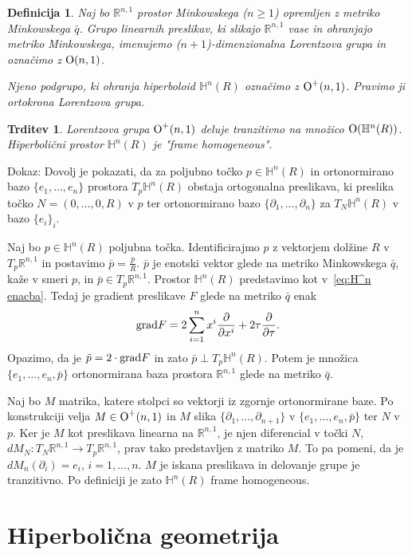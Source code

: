 \documentclass[a4paper]{article}
\newtheorem{definicija}{Definicija}
\newtheorem{trditev}{Trditev}
\begin{document}
\begin{definicija}
Naj bo $\mathbb{R}^{n,1}$ prostor Minkowskega ($n \geq 1$) opremljen z metriko Minkowskega $\bar{q}$. Grupo linearnih preslikav, ki slikajo $\mathbb{R}^{n,1}$ vase in ohranjajo metriko Minkowskega, imenujemo \emph{($n+1$)-dimenzionalna Lorentzova grupa} in označimo z $\textup{O}(n,1)$.

Njeno podgrupo, ki ohranja hiperboloid $\mathbb{H}^{n}(R)$ označimo z $\textup{O}^{+}(n,1)$. Pravimo ji \emph{ortokrona Lorentzova grupa}.
\end{definicija}

\begin{trditev}
Lorentzova grupa $\textup{O}^{+}(n,1)$ deluje tranzitivno na množico $\textup{O}(\mathbb{H}^{n}(R))$. Hiperbolični prostor $\mathbb{H}^{n}(R)$ je "frame homogeneous".
\end{trditev}

Dokaz:
Dovolj je pokazati, da za poljubno točko $p \in \mathbb{H}^{n}(R)$ in ortonormirano bazo $\{e_{1}, \dots , e_{n} \}$ prostora $T_{p}\mathbb{H}^{n}(R)$ obstaja ortogonalna preslikava, ki preslika točko $N=(0, \dots , 0, R)$ v $p$ ter ortonormirano bazo $\{\partial_{1}, \dots , \partial_{n} \}$ za $T_{N}\mathbb{H}^{n}(R)$ v bazo $\{e_{i}\}_{i}$.

Naj bo $p \in \mathbb{H}^{n}(R)$ poljubna točka. Identificirajmo $p$ z vektorjem dolžine $R$ v $T_{p}\mathbb{R}^{n,1}$  in postavimo $\bar{p} = \frac{p}{R}$. $\bar{p}$ je enotski vektor glede na metriko Minkowskega $\bar{q}$, kaže v smeri $p$, in $\bar{p} \in T_{p}\mathbb{R}^{n,1}$.
Prostor $\mathbb{H}^{n}(R)$ predstavimo kot v~\ref{eq:H^n enacba}.
Tedaj je gradient preslikave $F$ glede na metriko $\bar{q}$ enak
\begin{equation}
\textup{grad} F = 2 \sum_{i=1}^{n} x^{i} \frac{\partial}{\partial x^{i}} + 2\tau \frac{\partial}{\partial \tau}. \nonumber
\end{equation} 
Opazimo, da je $\bar{p} = 2 \cdot \textup{grad} F$ in zato $\bar{p} \perp T_{p}\mathbb{H}^{n}(R)$.
Potem je množica $\{ e_{1}, \dots , e_{n}, \bar{p} \}$ ortonormirana baza prostora $\mathbb{R}^{n,1}$ glede na metriko $\bar{q}$.

Naj bo $M$ matrika, katere stolpci so vektorji iz zgornje ortonormirane baze. Po konstrukciji velja $M \in \textup{O}^{+}(n,1)$ in $M$ slika $\{\partial_{1}, \dots , \partial_{n+1} \}$ v $\{e_{1}, \dots , e_{n}, \bar{p} \}$ ter $N$ v $p$.
Ker je $M$ kot preslikava linearna na $\mathbb{R}^{n,1}$, je njen diferencial v točki $N$, $dM_{N} \colon T_{N}\mathbb{R}^{n,1} \to T_{p}\mathbb{R}^{n,1}$, prav tako predstavljen z matriko $M$. To pa pomeni, da je $dM_{n}(\partial_{i}) = e_{i}$, $i = 1, \dots , n$.
$M$ je iskana preslikava in delovanje grupe je tranzitivno. Po definiciji je zato $\mathbb{H}^{n}(R)$ frame homogeneous.

\section{Hiperbolična geometrija}


\begin{thebibliography}{99}

\end{thebibliography}
\end{document}
